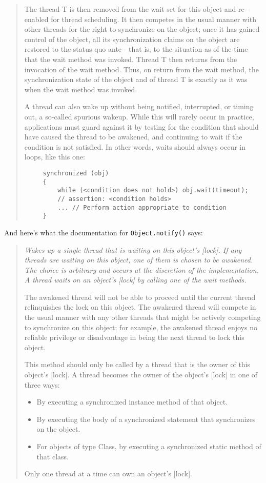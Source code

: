\documentclass{concdistfoils}
\begin{document}
\begin{slide}
\begin{itemize}
\begin{note}
\begin{quote}
The thread T is then removed from the wait set for this object and
re-enabled for thread scheduling. It then competes in the usual
manner with other threads for the right to synchronize on the object;
once it has gained control of the object, all its synchronization
claims on the object are restored to the status quo ante - that is,
to the situation as of the time that the wait method was invoked.
Thread T then returns from the invocation of the wait method. Thus,
on return from the wait method, the synchronization state of the
object and of thread T is exactly as it was when the wait method
was invoked.

A thread can also wake up without being notified, interrupted, or
timing out, a so-called spurious wakeup. While this will rarely
occur in practice, applications must guard against it by testing
for the condition that should have caused the thread to be awakened,
and continuing to wait if the condition is not satisfied. In other
words, waits should always occur in loops, like this one:

\begin{verbatim}
     synchronized (obj) 
     {
         while (<condition does not hold>) obj.wait(timeout);
         // assertion: <condition holds>
         ... // Perform action appropriate to condition
     }
\end{verbatim}
\end{quote}

And here's what the documentation for \texttt{Object.notify()} says:
\begin{quote} \it
Wakes up a single thread that is waiting on this object's [lock]. If
any threads are waiting on this object, one of them is chosen to be
awakened. The choice is arbitrary and occurs at the discretion of the
implementation. A thread waits on an object's [lock] by calling one of
the wait methods.

The awakened thread will not be able to proceed until the current thread
relinquishes the lock on this object. The awakened thread will compete in
the usual manner with any other threads that might be actively competing
to synchronize on this object; for example, the awakened thread enjoys
no reliable privilege or disadvantage in being the next thread to lock
this object.

This method should only be called by a thread that is the owner of this
object's [lock]. A thread becomes the owner of the object's [lock] in
one of three ways:

\begin{itemize}
    \item By executing a synchronized instance method of that object.
    \item By executing the body of a synchronized statement that synchronizes on the object.
    \item For objects of type Class, by executing a synchronized static method of that class. 
\end{itemize}
Only one thread at a time can own an object's [lock]. 
\end{quote}


\end{note}
\end{itemize}
\end{slide}
\end{document}
